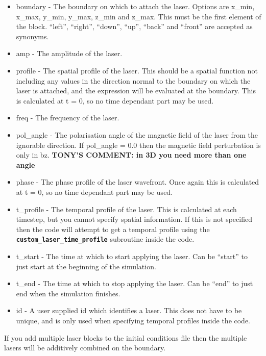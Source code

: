 \documentclass[12pt,a4paper]{article}
\newcommand{\inlinecode}[1]{{\color{warwickred} \bf\texttt{#1}}}
\newcommand{\tony}[1]{{\color{warwickred} \bf{TONY'S COMMENT:} \bf{#1}}\\}
\begin{document}
\begin{itemize}
\item boundary - The boundary on which to attach the laser. Options are x\_min,
  x\_max, y\_min, y\_max, z\_min and z\_max. This must be the first element of
  the block. ``left'', ``right'', ``down'', ``up'', ``back'' and ``front'' are
  accepted as synonyms.
\item amp - The amplitude of the laser.
\item profile - The spatial profile of the laser. This should be a spatial
  function not including any values in the direction normal to the boundary
  on which the laser is attached, and the expression will be evaluated at the
  boundary. This is calculated at t = 0, so no time dependant part may be used.
\item freq - The frequency of the laser.
\item pol\_angle - The polarisation angle of the magnetic field of the laser
  from the ignorable direction. If pol\_angle = 0.0 then the magnetic field
  perturbation is only in bz.    \tony{in 3D you need more than one angle}
\item phase - The phase profile of the laser wavefront. Once again this is
  calculated at t = 0, so no time dependant part may be used.
\item t\_profile - The temporal profile of the laser. This is calculated at
  each timestep, but you cannot specify spatial information. If this is not
  specified then the code will attempt to get a temporal profile using the
  \inlinecode{custom\_laser\_time\_profile} subroutine inside the code.
\item t\_start - The time at which to start applying the laser. Can be
  ``start'' to just start at the beginning of the simulation.
\item t\_end - The time at which to stop applying the laser. Can be ``end'' to
  just end when the simulation finishes.
\item id - A user supplied id which identifies a laser. This does not have to
  be unique, and is only used when specifying temporal profiles inside the
  code.
\end{itemize}

If you add multiple laser blocks to the initial conditions file then the
multiple lasers will be additively combined on the boundary.
\end{document}
